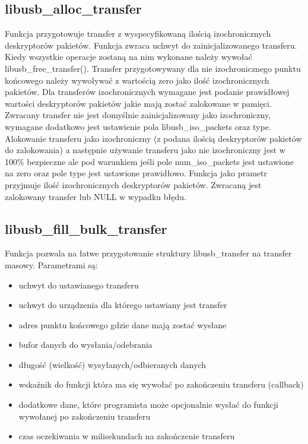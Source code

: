 \documentclass{BscUS}
\begin{document}
\subsection{libusb\_alloc\_transfer}
\noindent Funkcja przygotowuje transfer z wyspecyfikowaną ilością 	izochronicznych deskryptorów pakietów.
Funkcja zwraca uchwyt do zainicjalizowanego transferu. Kiedy wszystkie operacje zostaną na nim wykonane należy wywołać libusb\_free\_transfer().
Transfer przygotowywany dla nie izochronicznego punktu końcowego należy wywoływać z wartością zero jako ilość izochronicznych pakietów.
Dla transferów izochronicznych wymagane jest podanie prawidłowej wartości deskryptorów pakietów jakie mają zostać zalokowane w pamięci. Zwracany transfer nie jest domyślnie zainicjalizowany jako izochroniczny, wymagane dodatkowo jest ustawienie pola libusb\_iso\_packets oraz type.
Alokowanie transferu jako izochroniczny (z podana ilością deskryptorów pakietów do zalokowania) a następnie używanie transferu jako nie izochroniczny jest w 100\% bezpieczne ale pod warunkiem jeśli pole num\_iso\_packets jest ustawione na zero oraz pole type jest ustawione prawidłowo.
Funkcja jako prametr przyjmuje ilość izochronicznych deskryptorów pakietów.
Zwracaną jest zalokowany transfer lub NULL w wypadku błędu.
\subsection{libusb\_fill\_bulk\_transfer}
\noindent Funkcja pozwala na łatwe przygotowanie struktury libusb\_transfer na transfer masowy.
\newline
Parametrami są:
\begin{itemize}
\item uchwyt do ustawianego transferu
\item uchwyt do urządzenia dla którego ustawiany jest transfer
\item adres punktu końcowego gdzie dane mają zostać wysłane
\item bufor danych do wysłania/odebrania
\item długość (wielkość) wysyłanych/odbieranych danych
\item wskaźnik do funkcji która ma się wywołać po zakończeniu transferu (callback)
\item dodatkowe dane, które programista może opcjonalnie wysłać do funkcji wywołanej po zakończeniu transferu 
\item czas oczekiwania w milisekundach na zakończenie transferu
\end{itemize}
\end{document}
